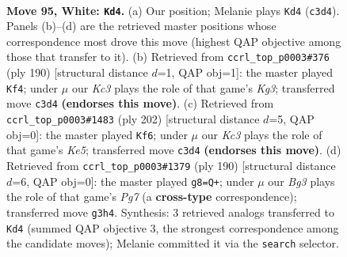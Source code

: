 \documentclass[11pt]{article}
\begin{document}
\clearpage

\begin{figure}[p]\centering
\begin{subfigure}{0.46\textwidth}\centering
\resizebox{\linewidth}{!}{%
\newchessgame
\chessboard[
  setfen={7k/2P5/8/8/8/2K3B1/8/8 w - - 15 95},
  showmover=false,
  pgfstyle=straightmove, color=movearrow, markmove={c3-d4}
]}
\caption{}
\end{subfigure}\hfill
\begin{subfigure}{0.46\textwidth}\centering
\resizebox{\linewidth}{!}{%
\newchessgame
\chessboard[
  setfen={7k/8/6P1/8/8/3B2K1/8/8 w - - 1 96},
  showmover=false,
  pgfstyle=straightmove, color=movearrow, markmove={g3-f4}
]}
\caption{}
\end{subfigure}
\\[4pt]
\begin{subfigure}{0.46\textwidth}\centering
\resizebox{\linewidth}{!}{%
\newchessgame
\chessboard[
  setfen={7k/8/6P1/4K3/4B3/8/8/8 w - - 1 102},
  showmover=false,
  pgfstyle=straightmove, color=movearrow, markmove={e5-f6}
]}
\caption{}
\end{subfigure}\hfill
\begin{subfigure}{0.46\textwidth}\centering
\resizebox{\linewidth}{!}{%
\newchessgame
\chessboard[
  setfen={8/6PK/4k3/8/8/8/8/8 w - - 3 96},
  showmover=false,
  pgfstyle=straightmove, color=movearrow, markmove={g7-g8}
]}
\caption{}
\end{subfigure}
\caption{\textbf{Move 95, White: \texttt{Kd4}.} (a) Our position; Melanie plays \texttt{Kd4} (\texttt{c3d4}). Panels (b)--(d) are the retrieved master positions whose correspondence most drove this move (highest QAP objective among those that transfer to it). (b) Retrieved from \texttt{ccrl\_top\_p0003\#376} (ply 190) [structural distance $d$=1, QAP obj=1]: the master played \texttt{Kf4}; under $\mu$ our \emph{Kc3} plays the role of that game's \emph{Kg3}; transferred move \texttt{c3d4} \textbf{(endorses this move)}. (c) Retrieved from \texttt{ccrl\_top\_p0003\#1483} (ply 202) [structural distance $d$=5, QAP obj=0]: the master played \texttt{Kf6}; under $\mu$ our \emph{Kc3} plays the role of that game's \emph{Ke5}; transferred move \texttt{c3d4} \textbf{(endorses this move)}. (d) Retrieved from \texttt{ccrl\_top\_p0003\#1379} (ply 190) [structural distance $d$=6, QAP obj=0]: the master played \texttt{g8=Q+}; under $\mu$ our \emph{Bg3} plays the role of that game's \emph{Pg7} (a \textbf{cross-type} correspondence); transferred move \texttt{g3h4}. Synthesis: 3 retrieved analogs transferred to \texttt{Kd4} (summed QAP objective 3, the strongest correspondence among the candidate moves); Melanie committed it via the \texttt{search} selector.}
\label{fig:thought-m188}
\end{figure}
\end{document}
